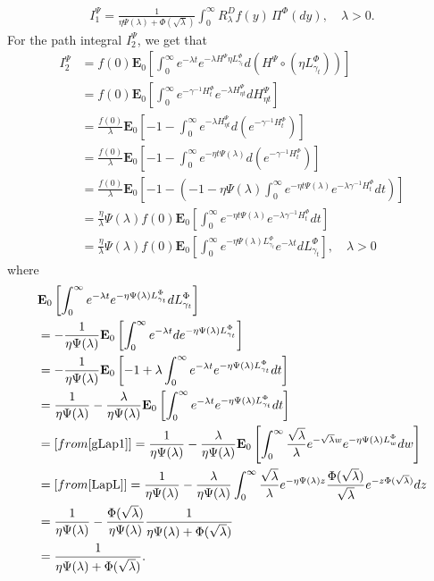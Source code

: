 \documentclass[11pt,a4paper]{article}
\theoremstyle{plain}
\theoremstyle{definition}
\theoremstyle{remark}
\begin{document}
		\begin{align*}
			I_1^\Psi=\frac{1}{\eta \Psi(\lambda) +\Phi(\sqrt \lambda)} \int_0^\infty R_\lambda^D f(y) \, \Pi^\Phi(dy), \quad \lambda>0.
		\end{align*}
		For the path integral $I_2^\Psi$, we get that
		\begin{align*}
			I_2^\Psi&= f(0) \mathbf{E}_0\left[\int_0^\infty e^{-\lambda t} e^{-\lambda H^\Psi\eta  L^\Phi_{\gamma_t}} d(H^\Psi \circ (\eta L^\Phi_{\gamma_t}))\right]\\
			&= f(0)  \mathbf{E}_0\left[\int_0^\infty e^{-\gamma^{-1} H^\Phi_t} e^{-\lambda H^\Psi_{\eta t}} dH^\Psi_{ \eta t}\right]\\
			&=\frac{f(0)}{\lambda} \mathbf{E}_0\left[-1-\int_0^\infty e^{-\lambda H^\Psi_{\eta t} } d\left(e^{-\gamma^{-1} H^\Phi_t}\right)\right]\\
			&=\frac{f(0)}{\lambda} \mathbf{E}_0\left[-1-\int_0^\infty e^{-\eta t \Psi(\lambda) } d\left(e^{-\gamma^{-1} H^\Phi_t}\right)\right]\\
			&=\frac{f(0)}{\lambda} \mathbf{E}_0\left[-1-\left(-1-\eta \Psi(\lambda)\int_0^\infty e^{-\eta t \Psi(\lambda) } e^{-\lambda \gamma^{-1}{H^\Phi_t}} dt \right)\right]\\
			&=\frac{\eta}{\lambda} \Psi(\lambda) f(0) \mathbf{E}_0\left[\int_0^\infty e^{-\eta t \Psi(\lambda)}e^{-\lambda \gamma^{-1} H^\Phi_t} dt\right]\\
			&=\frac{\eta}{\lambda} \Psi(\lambda) f(0) \mathbf{E}_0\left[\int_0^\infty e^{-\eta  \Psi(\lambda) L^\Phi_{\gamma_t}}e^{-\lambda t} d L^\Phi_{\gamma_t}\right], \quad \lambda>0
		\end{align*}
		where
		\begin{align*}
			& \mathbf{E}_0\left[\int_0^\infty e^{-\lambda t} e^{-\eta  \Psi(\lambda) L^\Phi_{\gamma_t}} d L^\Phi_{\gamma_t}\right]\\
			&=-\frac{1}{\eta \Psi(\lambda)} \mathbf{E}_0\left[\int_0^\infty e^{-\lambda t} de^{-\eta  \Psi(\lambda) L^\Phi_{\gamma_t}}\right]\\
			&=-\frac{1}{\eta \Psi(\lambda)}\mathbf{E}_0\left[-1+\lambda  \int_0^\infty e^{-\lambda t } e^{-\eta \Psi(\lambda) L^\Phi_{\gamma_t}} dt\right]\\
			&=\frac{1}{\eta \Psi(\lambda)}-\frac{\lambda}{\eta \Psi(\lambda)} \mathbf{E}_0\left[\int_0^\infty e^{-\lambda t} e^{- \eta \Psi(\lambda) L^\Phi_{\gamma_t}} dt\right]\\
			&=[\textrm{from \eqref{gLap1}}] = \frac{1}{\eta \Psi(\lambda)}-\frac{\lambda}{\eta \Psi(\lambda)} \mathbf{E}_0\left[\int_0^\infty \frac{\sqrt \lambda}{\lambda }e^{-\sqrt \lambda w} e^{- \eta \Psi(\lambda) L^\Phi_w} dw\right]\\
			&= [\textrm{from \eqref{LapL}}] = \frac{1}{\eta \Psi(\lambda)}-\frac{\lambda}{\eta \Psi(\lambda)} \int_0^\infty \frac{\sqrt \lambda}{\lambda } e^{-\eta \Psi(\lambda) z} \frac{\Phi(\sqrt \lambda)}{\sqrt \lambda} e^{-z \Phi(\sqrt \lambda)} dz\\
			&=\frac{1}{\eta \Psi(\lambda)}-\frac{\Phi(\sqrt \lambda)}{\eta \Psi(\lambda)}\frac{1}{\eta \Psi(\lambda)+ \Phi(\sqrt \lambda)}\\
			&=\frac{1}{\eta \Psi(\lambda)+ \Phi(\sqrt \lambda)}.
		\end{align*}
\end{document}
